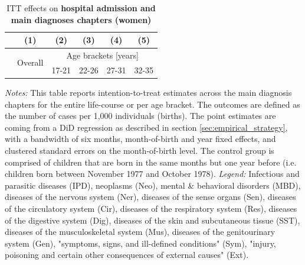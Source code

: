 \documentclass[11pt, a4paper]{article} %
\begin{document}
\newpage
{} 
\vspace*{\fill}
\begin{table}[H] \centering 
	\begin{threeparttable} \centering \caption{ITT effects on \textbf{hospital admission and main diagnoses chapters (women)}}\label{tab: ITT_across_chapters_per_age_group_women}
		{\def\sym#1{\ifmmode^{#1}\else\(^{#1}\)\fi} 
			\begin{tabular}{l*{5}{c}}
				\toprule 
				&\multicolumn{1}{c}{(1)}&\multicolumn{1}{c}{(2)}&\multicolumn{1}{c}{(3)}&\multicolumn{1}{c}{(4)}&\multicolumn{1}{c}{(5)}\\
				\midrule
				&\multirow{2}{*}{Overall} & \multicolumn{4}{c}{Age brackets [years]} \\ 
				\cmidrule(lr){3-6}
				&&\multicolumn{1}{c}{17-21}&\multicolumn{1}{c}{22-26}&\multicolumn{1}{c}{27-31}&\multicolumn{1}{c}{32-35}\\
				
				\midrule
				
				
				
				\bottomrule 
		\end{tabular}}
	\end{threeparttable} 
	\begin{minipage}{0.9\linewidth}
		\scriptsize \emph{Notes:} This table reports intention-to-treat estimates across the main diagnosis chapters for the entire life-course or per age bracket. The outcomes are defined as the number of cases per 1,000 individuals (births). The point estimates are coming from a DiD regression as described in section \ref{sec:empirical_strategy}, with a bandwidth of six months, month-of-birth and year fixed effects, and clustered standard errors on the month-of-birth level. The control group is comprised of children that are born in the same months but one year before (i.e. children born between November 1977 and October 1978).\newline
		\emph{Legend:} Infectious and parasitic diseases (IPD), neoplasms (Neo), mental \& behavioral disorders (MBD), diseases of the nervous system (Ner), diseases of the sense organs (Sen), diseases of the circulatory system (Cir), diseases of the respiratory system (Res), diseases of the digestive system (Dig), diseases of the skin and subcutaneous tissue (SST), diseases of the musculoskeletal system (Mus), diseases of the genitourinary system (Gen), "symptoms, signs, and ill-defined conditions" (Sym), "injury, poisoning and certain other consequences of external causes" (Ext).
	\end{minipage}
\end{table} 
\vspace*{\fill}\clearpage 
\restoregeometry
\end{document}
